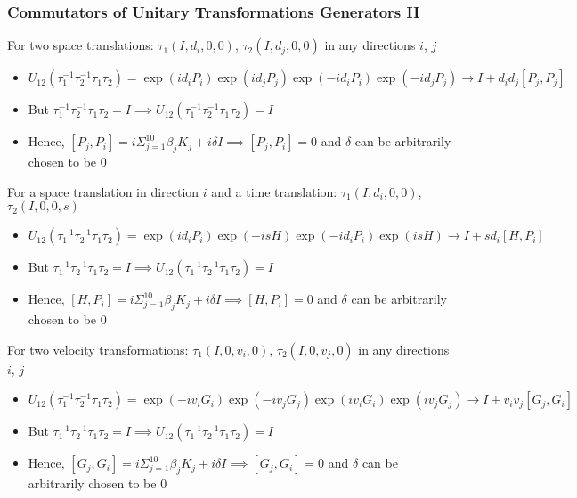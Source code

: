 \documentclass[8pt,t,mathserif,aspectratio=169]{beamer}
\begin{document}
\begin{frame}
  \frametitle{Commutators of Unitary Transformations Generators II}
  \vspace{1mm}
  For two space translations: $\tau_1(I,d_i,0,0)$, $\tau_2(I,d_j,0,0)$ in any directions $i$, $j$
  \begin{itemize}
    \item $U_{12}(\tau^{-1}_1 \tau^{-1}_2 \tau_1 \tau_2) = \exp(i d_i P_i) \exp(i d_j P_j) \exp(-i d_i P_i) \exp(-i d_j P_j) \to I + d_i d_j [P_j,P_j]$
    \item But $\tau^{-1}_1 \tau^{-1}_2 \tau_1 \tau_2 = I \implies U_{12}(\tau^{-1}_1 \tau^{-1}_2 \tau_1 \tau_2) = I$
    \item Hence, $[P_j,P_i] = i \Sigma_{j = 1}^{10} \beta_j K_j + i \delta I \implies [P_j,P_i] = 0$ and $\delta$ can be arbitrarily chosen to be $0$
  \end{itemize}
  For a space translation in direction $i$ and a time translation: $\tau_1(I,d_i,0,0)$, $\tau_2(I,0,0,s)$
  \begin{itemize}
    \item $U_{12}(\tau^{-1}_1 \tau^{-1}_2 \tau_1 \tau_2) = \exp(i d_i P_i) \exp(-i s H) \exp(-i d_i P_i) \exp(i s H) \to I + s d_i [H,P_i]$
    \item But $\tau^{-1}_1 \tau^{-1}_2 \tau_1 \tau_2 = I \implies U_{12}(\tau^{-1}_1 \tau^{-1}_2 \tau_1 \tau_2) = I$
    \item Hence, $[H,P_i] = i \Sigma_{j = 1}^{10} \beta_j K_j + i \delta I \implies [H,P_i] = 0$ and $\delta$ can be arbitrarily chosen to be $0$
  \end{itemize}
  For two velocity transformations: $\tau_1(I,0,v_i,0)$, $\tau_2(I,0,v_j,0)$ in any directions $i$, $j$
  \begin{itemize}
    \item $U_{12}(\tau^{-1}_1 \tau^{-1}_2 \tau_1 \tau_2) = \exp(-i v_i G_i) \exp(-i v_j G_j) \exp(i v_i G_i) \exp(i v_j G_j) \to I + v_i v_j [G_j,G_i]$
    \item But $\tau^{-1}_1 \tau^{-1}_2 \tau_1 \tau_2 = I \implies U_{12}(\tau^{-1}_1 \tau^{-1}_2 \tau_1 \tau_2) = I$
    \item Hence, $[G_j,G_i] = i \Sigma_{j = 1}^{10} \beta_j K_j + i \delta I \implies [G_j,G_i] = 0$ and $\delta$ can be arbitrarily chosen to be $0$
  \end{itemize}
\end{frame}
\end{document}
